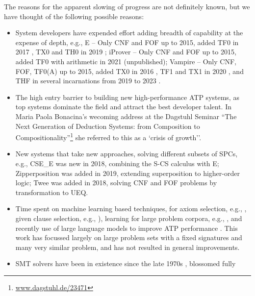 \documentclass[runningheads]{llncs}
\begin{document}
The reasons for the apparent slowing of progress are not definitely known, but we have thought of 
the following possible reasons:
\begin{itemize}
\item System developers have expended effort adding breadth of capability at the expense of 
      depth, e.g., 
      E -- Only CNF and FOF up to 2015, added TF0 in 2017 \cite{SCV19}, TX0 and TH0 in 2019 
           \cite{VB+19};
      iProver -- Only CNF and FOF up to 2015, added TF0 with arithmetic in 2021 (unpublished);
      Vampire -- Only CNF, FOF, TF0(A) up to 2015, added TX0 in 2016 \cite{KK+16}, 
           TF1 and TX1 in 2020 \cite{BR20-IJCAR}, and THF in several incarnations from 2019 to 
           2023 \cite{BR19,Bha20-Thesis,BRS23}.
\item The high entry barrier to building new high-performance ATP systems, as top systems
      dominate the field and attract the best developer talent.
      In Maria Paola Bonacina's wecoming address at the Dagstuhl Seminar ``The Next Generation 
      of Deduction Systems: from Composition to Compositionality''\footnote{%
      \href{https://www.dagstuhl.de/23471}{www.dagstuhl.de/23471}} she referred to this as a
     `crisis of growth''.
\item New systems that take new approaches, solving different subsets of SPCs, e.g.,
      CSE\_E \cite{XL+18} was new in 2018, combining the S-CS calculus with E;
      Zipperposition \cite{BB+21} was added in 2019, extending superposition to higher-order logic;
      Twee \cite{Sma21} was added in 2018, solving CNF and FOF problems by transformation to UEQ.
\item Time spent on machine learning based techniques, for 
      axiom selection, e.g., \cite{Urb06,KB14}, 
      given clause selection, e.g., \cite{JU17-CICM,CA+21,AA+22-ML,MS23}), 
      learning for large problem corpora, e.g., \cite{KM+14,JU19,BL+19-ICML}, 
      and recently use of large language models to improve ATP performance \cite{WX+23,AS+23}.
      This work has focussed largely on large problem sets with a fixed signatures and many
      very similar problem, and has not resulted in general improvements.
\item SMT solvers have been in existence since the late 1970s \cite{NO79}, blossomed fully

\end{itemize}
\end{document}
